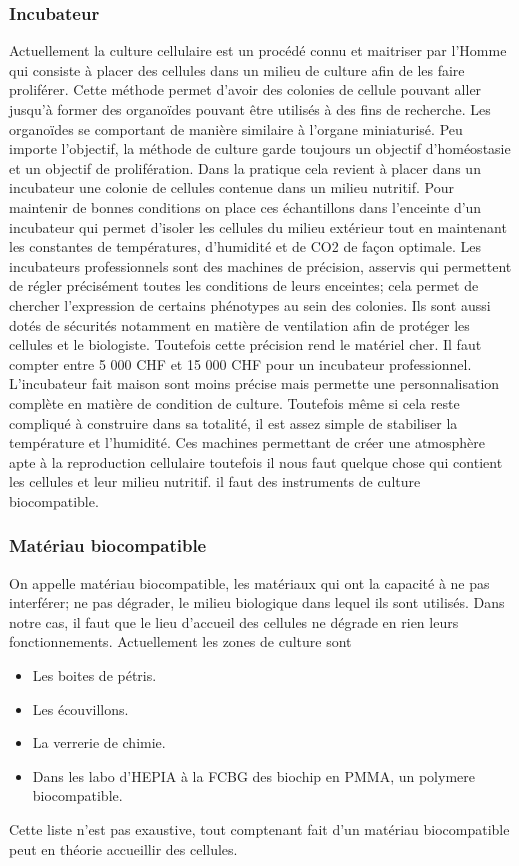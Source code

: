 \documentclass[a4paper, 11pt]{article}
\begin{document}
\subsubsection{Incubateur}
Actuellement la culture cellulaire est un procédé connu et maitriser par l'Homme qui consiste à placer des cellules dans
un milieu de culture afin de les faire proliférer.
Cette méthode permet d'avoir des colonies de cellule pouvant aller jusqu'à former des organoïdes pouvant être utilisés
à des fins de recherche. Les organoïdes se comportant de manière similaire à l'organe miniaturisé.
Peu importe l'objectif, la méthode de culture garde toujours un objectif d'homéostasie et un objectif de prolifération. Dans la pratique cela revient
à placer dans un incubateur une colonie de cellules contenue dans un milieu nutritif.
Pour maintenir de bonnes conditions on place ces échantillons dans l'enceinte d'un incubateur qui permet d'isoler les cellules du milieu extérieur tout
en maintenant les constantes de températures, d'humidité et de CO2 de façon optimale.
Les incubateurs professionnels sont des machines de précision, asservis qui permettent de régler précisément toutes les conditions de leurs enceintes;
cela permet de chercher l'expression de certains phénotypes au sein des colonies.
Ils sont aussi dotés de sécurités notamment en matière de ventilation afin de protéger les cellules et le biologiste. Toutefois cette précision rend le matériel cher.
Il faut compter entre 5 000 CHF et 15 000 CHF pour un incubateur professionnel.
L'incubateur fait maison sont moins précise mais permette une personnalisation complète en matière de condition de culture.
Toutefois même si cela reste compliqué à construire dans sa totalité, il est assez simple de stabiliser la température et l'humidité.
Ces machines permettant de créer une atmosphère apte à la reproduction cellulaire toutefois il nous faut quelque chose qui contient les cellules et leur milieu nutritif.
il faut des instruments de culture biocompatible.
\subsubsection{Matériau biocompatible}
On appelle matériau biocompatible, les matériaux qui ont la capacité à ne pas interférer;
ne pas dégrader, le milieu biologique dans lequel ils sont utilisés. Dans notre cas, il faut
que le lieu d'accueil des cellules ne dégrade en rien leurs fonctionnements.
Actuellement les zones de culture sont
\begin{itemize}
    \item Les boites de pétris.
    \item Les écouvillons.
    \item La verrerie de chimie.
    \item Dans les labo d'HEPIA à la FCBG des biochip en PMMA, un polymere biocompatible.
\end{itemize}
Cette liste n'est pas exaustive, tout comptenant fait d'un matériau biocompatible peut en théorie
accueillir des cellules.
\end{document}

